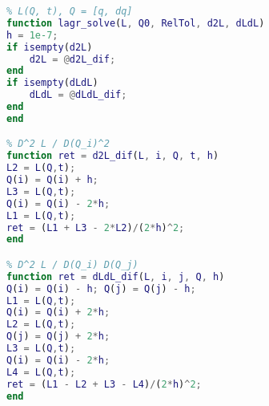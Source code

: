 \begin{lstlisting}[language=matlab, caption=lagr\_solve.m]
% 数值解拉格朗日方程
% L(Q, t), Q = [q, dq]
function lagr_solve(L, Q0, RelTol, d2L, dLdL)
h = 1e-7;
if isempty(d2L)
    d2L = @d2L_dif;
end
if isempty(dLdL)
    dLdL = @dLdL_dif;
end
end

% D^2 L / D(Q_i)^2
function ret = d2L_dif(L, i, Q, t, h)
L2 = L(Q,t);
Q(i) = Q(i) + h;
L3 = L(Q,t);
Q(i) = Q(i) - 2*h;
L1 = L(Q,t);
ret = (L1 + L3 - 2*L2)/(2*h)^2;
end

% D^2 L / D(Q_i) D(Q_j)
function ret = dLdL_dif(L, i, j, Q, h)
Q(i) = Q(i) - h; Q(j) = Q(j) - h;
L1 = L(Q,t);
Q(i) = Q(i) + 2*h;
L2 = L(Q,t);
Q(j) = Q(j) + 2*h;
L3 = L(Q,t);
Q(i) = Q(i) - 2*h;
L4 = L(Q,t);
ret = (L1 - L2 + L3 - L4)/(2*h)^2;
end
\end{lstlisting}
